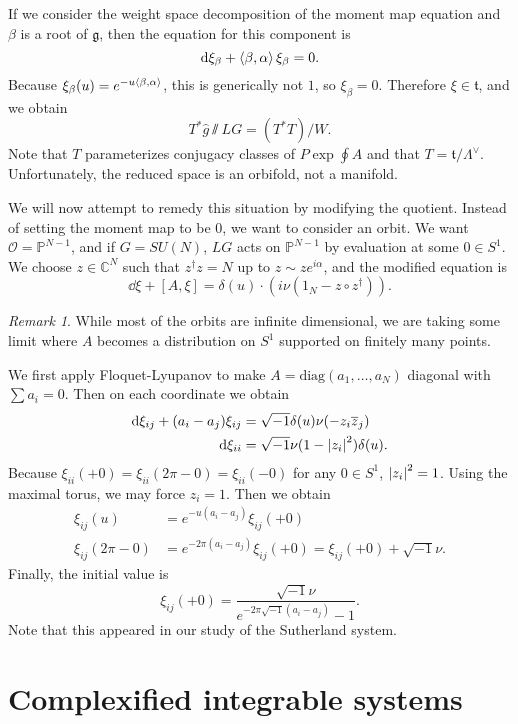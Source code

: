 \documentclass[leqno, openany]{memoir}
\theoremstyle{definition}
\theoremstyle{remark}
\newtheorem{rmk}[thm]{Remark}
\theoremstyle{plain}
\theoremstyle{definition}
\theoremstyle{remark}
\newcommand{\C}{\mathbb{C}}
\renewcommand{\P}{\mathbb{P}}
\newcommand{\g}{\mathfrak{g}}
\newcommand{\mc}[1]{\mathcal{#1}}
\newcommand{\mf}[1]{\mathfrak{#1}}
\newcommand{\mr}[1]{\mathrm{#1}}
\newcommand{\ol}[1]{\overline{#1}}
\newcommand{\wh}[1]{\widehat{#1}}
\begin{document}
If we consider the weight space decomposition of the moment map equation and $\beta$ is a root of $\g$, then the equation for this component is
\[ \dd{\xi_{\beta}} + \ev{\beta, \alpha} \xi_{\beta} = 0. \]
Because $\xi_{\beta}(u) = e^{-u\ev{\beta, \alpha}}$, this is generically not $1$, so $\xi_{\beta} = 0$. Therefore $\xi \in \mf{t}$, and we obtain
\[ T^* \wh{g} \sslash LG = (T^* T)/W. \]
Note that $T$ parameterizes conjugacy classes of $P \exp \oint A$ and that $T = \mf{t}/\Lambda^{\vee}$. Unfortunately, the reduced space is an orbifold, not a manifold.

We will now attempt to remedy this situation by modifying the quotient. Instead of setting the moment map to be $0$, we want to consider an orbit. We want $\mc{O} = \P^{N-1}$, and if $G = SU(N)$, $LG$ acts on $\P^{N-1}$ by evaluation at some $0 \in S^1$. We choose $z \in \C^N$ such that $z^{\dag} z = N$ up to $z \sim ze^{i\alpha}$, and the modified equation is
\[ \dd{\xi} + [A, \xi] = \delta(u) \cdot (i \nu(1_N - z \circ z^{\dag})). \]

\begin{rmk}
While most of the orbits are infinite dimensional, we are taking some limit where $A$ becomes a distribution on $S^1$ supported on finitely many points.
\end{rmk}

We first apply Floquet-Lyupanov to make $A = \mr{diag}(a_1, \ldots, a_N)$ diagonal with $\sum a_i = 0$. Then on each coordinate we obtain
\begin{align*}
  \dd{\xi_{ij}} + (a_i-a_j) \xi_{ij} &= \sqrt{-1} \delta(u)\nu(-z_i \ol{z}_j) \\
  \dd{\xi_{ii}} &= \sqrt{-1} \nu(1-\abs{z_i}^2) \delta(u).
\end{align*}
Because $\xi_{ii}(+0) = \xi_{ii}(2\pi-0) = \xi_{ii}(-0)$ for any $0 \in S^1$, $\abs{z_i}^2 = 1$. Using the maximal torus, we may force $z_i = 1$. Then we obtain
\begin{align*}
  \xi_{ij}(u) &= e^{-u(a_i-a_j)}\xi_{ij}(+0) \\
  \xi_{ij}(2\pi-0) &= e^{-2\pi(a_i-a_j)}\xi_{ij}(+0) = \xi_{ij}(+0) + \sqrt{-1} \nu.
\end{align*}
Finally, the initial value is
\[ \xi_{ij}(+0) = \frac{\sqrt{-1}\nu}{e^{-2\pi \sqrt{-1}(a_i-a_j)}-1}. \]
Note that this appeared in our study of the Sutherland system.

\chapter{Complexified integrable systems}
\label{cha:complexified}
\end{document}
